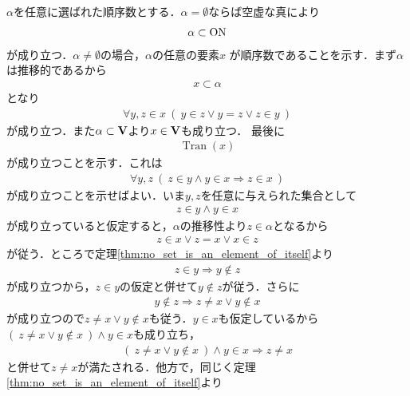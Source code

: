 	\begin{prf} 
		$\alpha$を任意に選ばれた順序数とする．$\alpha = \emptyset$ならば空虚な真により
				\begin{align}
					\alpha \subset \mathrm{ON}
				\end{align}
				が成り立つ．$\alpha \neq \emptyset$の場合，$\alpha$の任意の要素$x$
				が順序数であることを示す．まず$\alpha$は推移的であるから
				\begin{align}
					x \subset \alpha
				\end{align}
				となり
				\begin{align}
					\forall y,z \in x\ (\ y \in z \vee y = z \vee z \in y\ )
				\end{align}
				が成り立つ．また$\alpha \subset \mathbf{V}$より$x \in \mathbf{V}$も成り立つ．
				最後に
				\begin{align}
					\operatorname{Tran}(x)
				\end{align}
				が成り立つことを示す．これは
				\begin{align}
					\forall y,z\ (\ z \in y \wedge y \in x
					\Longrightarrow z \in x \ )
					\label{eq:thm_On_is_transitive_1}
				\end{align}
				が成り立つことを示せばよい．いま$y,z$を任意に与えられた集合として
				\begin{align}
					z \in y \wedge y \in x
				\end{align}
				が成り立っていると仮定すると，$\alpha$の推移性より$z \in \alpha$となるから
				\begin{align}
					z \in x \vee z = x \vee x \in z
				\end{align}
				が従う．ところで定理\ref{thm:no_set_is_an_element_of_itself}より
				\begin{align}
					z \in y \Longrightarrow y \notin z
				\end{align}
				が成り立つから，$z \in y$の仮定と併せて$y \notin z$が従う．さらに
				\begin{align}
					y \notin z \Longrightarrow z \neq x \vee y \notin x
				\end{align}
				が成り立つので$z \neq x \vee y \notin x$も従う．$y \in x$も仮定しているから
				$(\ z \neq x \vee y \notin x\ ) \wedge y \in x$も成り立ち，
				\begin{align}
					(\ z \neq x \vee y \notin x\ ) \wedge y \in x
					\Longrightarrow z \neq x
				\end{align}
				と併せて$z \neq x$が満たされる．他方で，同じく定理\ref{thm:no_set_is_an_element_of_itself}より
				\begin{align}

\end{align}
\end{prf}
